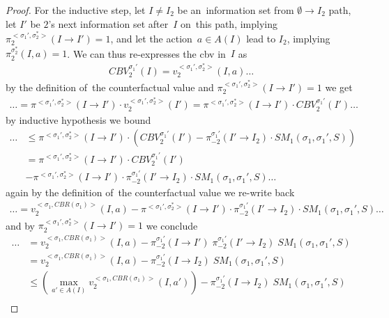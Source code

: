\begin{proof}
  For the inductive step, let $I \ne I_2$ be an~information set from $\emptyset \to I_2$ path, let $I'$ be $2$'s next information set after~$I$ on~this path, implying $\pi_2^{<\sigma_1', \sigma_2^*>} (I \to I') = 1$, and let the action~$a\in A(I)$ lead to $I_2$, implying $\pi^{\sigma_2^*}_2(I, a) = 1$.
  We can thus re-expresses the \acrshort{cbv} in~$I$ as
  \begin{align*}
    CBV_2^{\sigma_1'}(I)
    = v_2^{<\sigma_1', \sigma_2^*>} (I, a)
    \ldots
  \end{align*}
  by the definition of~the counterfactual value and $\pi_2^{<\sigma_1', \sigma_2^*>} (I \to I') = 1$ we get
  \begin{align*}
    \ldots
    = \pi^{<\sigma_1', \sigma_2^*>}(I\to I') \cdot v_2^{<\sigma_1', \sigma_2^*>}(I')
    = \pi^{<\sigma_1', \sigma_2^*>}(I\to I') \cdot CBV_2^{\sigma_1'}(I')
    \ldots
  \end{align*}
  by inductive hypothesis we bound
  \begin{align*}
    \ldots
    &\le \pi^{<\sigma_1', \sigma_2^*>}(I \to I') \cdot \left( CBV_2^{\sigma_1'}(I') - \pi_{-2}^{\sigma_1'}(I' \to I_2) \cdot SM_1(\sigma_1 , \sigma_1', S) \right) \\
    &= \pi^{<\sigma_1', \sigma_2^*>}(I \to I') \cdot CBV_2^{\sigma_1'}(I') \\
    &- \pi^{<\sigma_1', \sigma_2^*>}(I \to I') \cdot \pi_{-2}^{\sigma_1'}(I' \to I_2) \cdot SM_1(\sigma_1 , \sigma_1', S)
    \ldots
  \end{align*}
  again by the definition of~the counterfactual value we re-write back
  \begin{align*}
    \ldots
    = v_2^{<\sigma_1, CBR(\sigma_1)>} (I, a) - \pi^{<\sigma_1', \sigma_2^*>}(I \to I') \cdot \pi_{-2}^{\sigma_1'}(I' \to I_2) \cdot SM_1(\sigma_1 , \sigma_1', S)
    \ldots
  \end{align*}
  and by $\pi_2^{<\sigma_1', \sigma_2^*>} (I \to I') = 1$ we conclude
  \begin{align*}
    \ldots
    &= v_2^{<\sigma_1, CBR(\sigma_1)>} (I, a) - \pi^{\sigma_1'}_{-2}(I \to I') \; \pi_{-2}^{\sigma_1'}(I' \to I_2) \; SM_1(\sigma_1 , \sigma_1', S) \\
    &= v_2^{<\sigma_1, CBR(\sigma_1)>} (I, a) - \pi^{\sigma_1'}_{-2}(I \to I_2) \; SM_1(\sigma_1 , \sigma_1', S) \\
    &\le \left( \max_{a'\in A(I)} v_2^{<\sigma_1, CBR(\sigma_1)>} (I, a') \right) - \pi^{\sigma_1'}_{-2}(I \to I_2) \; SM_1(\sigma_1 , \sigma_1', S) \\

\end{align*}
\end{proof}
